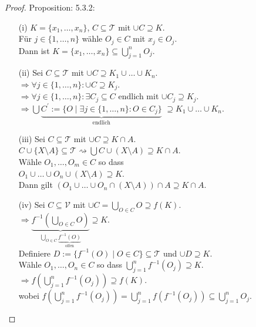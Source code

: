 \begin{proof}{Proposition: 5.3.2:}\\
    \begin{itemize}
        \item[(i)]$K = \{x_1,\ldots,x_n\}$, $C \subseteq \mathcal{T}$ mit $\cup C \supseteq K$.\\
        Für $j \in \{1, \ldots, n\}$ wähle $O_j \in C$ mit $x_j \in O_j$.\\
        Dann ist $K = \{x_1, \ldots, x_n\} \subseteq \bigcup_{j=1}^{n} O_j$.
        \item[(ii)] Sei $C \subseteq \mathcal{T}$ mit $\cup C \supseteq K_1 \cup \ldots \cup K_n$.\\
        $\Rightarrow \forall j \in \{1, \ldots, n\} : \cup C \supseteq K_j$.\\
        $\Rightarrow \forall j \in \{1, \ldots, n\} : \exists C_j \subseteq C$ endlich
        mit $\cup C_j \supseteq K_j$.\\
        $\Rightarrow \bigcup \underbrace{C^{'} := \{O \mid \exists j \in \{1, \ldots, n\} : O \in C_j\}}_{\text{endlich}}$
        $\supseteq K_1 \cup \ldots \cup K_n$.
        \item[(iii)] Sei $C \subseteq \mathcal{T}$ mit $\cup C \supseteq K \cap A$.\\
        $C \cup \{X \setminus A\} \subseteq \mathcal{T} 
        \rightsquigarrow \bigcup C \cup (X \setminus A) \supseteq K \cap A$.\\
        Wähle $O_1, \ldots, O_m \in C$ so dass\\
        $O_1 \cup \ldots \cup O_n \cup (X \setminus A) \supseteq K$.\\
        Dann gilt $(O_1 \cup \ldots \cup O_n \cap (X \setminus A)) \cap A\supseteq K \cap A$.\\
        \item[(iv)] Sei $C \subseteq \mathcal{V}$ mit $\cup C = \bigcup_{O \in C} O \supseteq f(K)$.\\
        $\Rightarrow \underbrace{f^{-1}(\bigcup_{O \in C} O)}_{\bigcup_{O\in C}
        \underbrace{f^{-1}(O)}_{\text{offen}}} \supseteq K$.\\
        Definiere $D:= \{f^{-1}(O) \mid O \in C\} \subseteq \mathcal{T}$ und $\cup D \supseteq K$.\\
        Wähle $O_1, \ldots, O_n \in C$ so dass $\bigcup_{j=1}^{n} f^{-1}(O_j) \supseteq K$.\\
        $\Rightarrow f(\bigcup_{j=1}^{n} f^{-1}(O_j)) \supseteq f(K)$.\\
        wobei $f(\bigcup_{j=1}^{n} f^{-1}(O_j)) = \bigcup_{j=1}^{n} f(f^{-1}(O_j)) \subseteq \bigcup_{j=1}^{n} O_j$.\\
    \end{itemize}
\end{proof}


